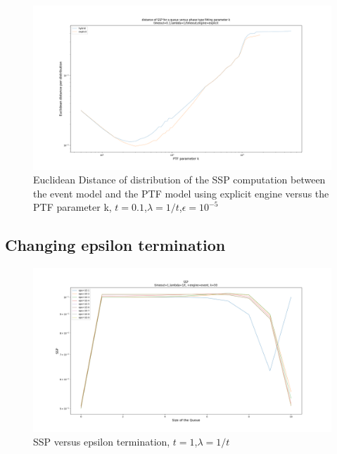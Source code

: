 \documentclass[paper=a4, fontsize=11pt]{scrartcl}
\numberwithin{equation}{section}		%
\numberwithin{figure}{section}			%
\numberwithin{table}{section}				%
\begin{document}
	
	\begin{figure}
		\centering
		\includegraphics[width=18cm]{picture/eucl_distance.png}
		\caption{Euclidean Distance of distribution of the SSP computation between the event model and the PTF model using explicit engine versus the PTF parameter k,	$t=0.1$,$\lambda=1/t$,$\epsilon=10^{-5}$}
		\label{fig:dist02_explicit_001}
	\end{figure}
	
\subsection{Changing epsilon termination}

	\begin{figure}
		\centering
		\includegraphics[width=20cm]{picture/epsilon_event.png}
		\caption{SSP versus epsilon termination, $t=1$,$\lambda=1/t$}
		\label{fig:epsilon_event}
	\end{figure}
	
\end{document}

